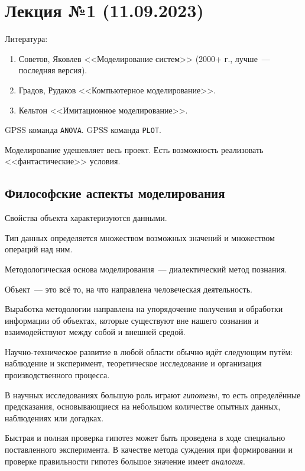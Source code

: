 \section{Лекция №1 (11.09.2023)}

Литература:

\begin{enumerate}
    \item Советов, Яковлев <<Моделирование систем>> (2000+ г., лучше~--- последняя версия).
    \item Градов, Рудаков <<Компьютерное моделирование>>.
    \item Кельтон <<Имитационное моделирование>>.
\end{enumerate}

GPSS команда \texttt{ANOVA}. GPSS команда \texttt{PLOT}.

Моделирование удешевляет весь проект. Есть возможность реализовать <<фантастические>> условия.

\subsection{Философские аспекты моделирования}

Свойства объекта характеризуются данными.

Тип данных определяется множеством возможных значений и множеством операций над ним.

Методологическая основа моделирования~--- диалектический метод познания.

\begin{dd}
    Объект~--- это всё то, на что направлена человеческая деятельность.
\end{dd}

Выработка методологии направлена на упорядочение получения и обработки информации об объектах, которые существуют вне нашего сознания и взаимодействуют между собой и внешней средой.

Научно-техническое развитие в любой области обычно идёт следующим путём: наблюдение и эксперимент, теоретическое исследование и организация производственного процесса.

В научных исследованиях большую роль играют \textit{гипотезы}, то есть определённые предсказания, основывающиеся на небольшом количестве опытных данных, наблюдениях или догадках.

Быстрая и полная проверка гипотез может быть проведена в ходе специально поставленного эксперимента. В качестве метода суждения при формировании и проверке правильности гипотез большое значение имеет \textit{аналогия}.

